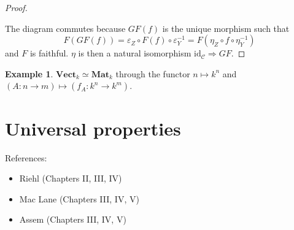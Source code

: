 \documentclass{article}
\newcommand{\id}{\mathrm{id}}
\newcommand{\cat}{\mathcal{C}}
\newcommand{\Vectcat}{\mathbf{Vect}}
\theoremstyle{plain}
\theoremstyle{definition}
\newtheorem{example}[theorem]{Example}
\theoremstyle{remark}
\begin{document}
\begin{proof}
    \begin{center}
    \end{center}
    The diagram commutes because $GF(f)$ is the unique morphism such that
    \[F(GF(f)) = \varepsilon_Z \circ F(f) \circ \varepsilon_Y^{-1} = F(\eta_Z \circ f \circ \eta_Y^{-1})\] and $F$ is faithful. $\eta$ is then a natural isomorphism $\id_\cat \Rightarrow GF$.
\end{proof}

\begin{example}
    $\Vectcat_k \simeq \mathbf{Mat}_k$ through the functor $n \mapsto k^n$ and $(A : n \to m) \mapsto (f_A : k^n \to k^m)$.
\end{example}
\newpage
\section{Universal properties}
References:
\begin{itemize}
    \item Riehl (Chapters II, III, IV)
    \item Mac Lane (Chapters III, IV, V)
    \item Assem (Chapters III, IV, V)
\end{itemize}
\end{document}
